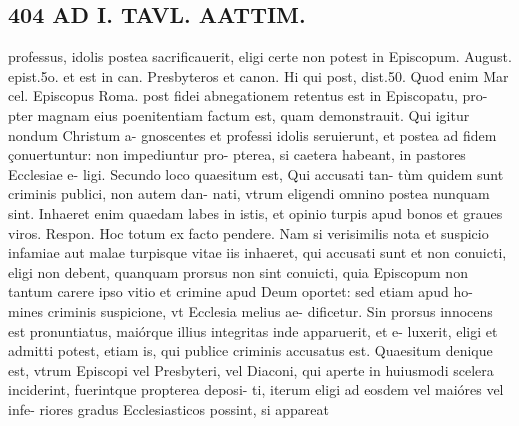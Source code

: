 \documentclass{article}
\begin{document}
\begin{pages}
\section*{404 AD I. TAVL. AATTIM. }\pstart professus, idolis postea sacrificauerit, eligi certe non potest in Episcopum. August. epist.5o. et est in can. Presbyteros et canon. Hi qui post, dist.50. Quod enim Mar cel. Episcopus Roma. post fidei abnegationem retentus est in Episcopatu, pro- pter magnam eius poenitentiam factum est, quam demonstrauit. Qui igitur nondum Christum a- gnoscentes et professi idolis seruierunt, et postea ad fidem çonuertuntur: non impediuntur pro- pterea, si caetera habeant, in pastores Ecclesiae e- ligi.  \pend\pstart Secundo loco quaesitum est, Qui accusati tan- tùm quidem sunt criminis publici, non autem dan- nati, vtrum eligendi omnino postea nunquam sint. Inhaeret enim quaedam labes in istis, et opinio turpis apud bonos et graues viros. Respon. Hoc totum ex facto pendere. Nam si verisimilis nota et suspicio infamiae aut malae turpisque vitae iis inhaeret, qui accusati sunt et non conuicti, eligi non debent, quanquam prorsus non sint conuicti, quia Episcopum non tantum carere ipso vitio et crimine apud Deum oportet: sed etiam apud ho- mines criminis suspicione, vt Ecclesia melius ae- dificetur. Sin prorsus innocens est pronuntiatus, maiórque illius integritas inde apparuerit, et e- luxerit, eligi et admitti potest, etiam is, qui publice criminis accusatus est.  \pend\pstart Quaesitum denique est, vtrum Episcopi vel Presbyteri, vel Diaconi, qui aperte in huiusmodi scelera inciderint, fuerintque propterea deposi- ti, iterum eligi ad eosdem vel maióres vel infe- riores gradus Ecclesiasticos possint, si appareat  \pend

\end{pages}
\end{document}

